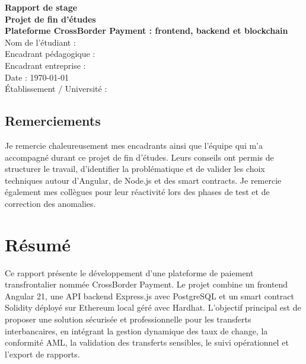 \documentclass[a4paper,12pt]{report}
\begin{document}
\begin{titlepage}
  \centering
  {\Huge\bfseries Rapport de stage \\ Projet de fin d'études \\ [2em]}
  {\Large\bfseries Plateforme CrossBorder Payment : frontend, backend et blockchain \\ [4em]}
  {\large Nom de l'étudiant : \underline{\hspace{8cm}} \\ [0.5em]}
  {\large Encadrant pédagogique : \underline{\hspace{8cm}} \\ [0.5em]}
  {\large Encadrant entreprise : \underline{\hspace{8cm}} \\ [0.5em]}
  {\large Date : \today \\ [4em]}
  \vfill
  {\large Établissement / Université : \underline{\hspace{8cm}}}
\end{titlepage}

\cleardoublepage
\thispagestyle{empty}
\section*{Remerciements}
Je remercie chaleureusement mes encadrants ainsi que l'équipe qui m'a accompagné durant ce projet de fin d'études. Leurs conseils ont permis de structurer le travail, d'identifier la problématique et de valider les choix techniques autour d'Angular, de Node.js et des smart contracts. Je remercie également mes collègues pour leur réactivité lors des phases de test et de correction des anomalies.

\vfill

\cleardoublepage
\chapter*{Résumé}
Ce rapport présente le développement d'une plateforme de paiement transfrontalier nommée CrossBorder Payment. Le projet combine un frontend Angular 21, une API backend Express.js avec PostgreSQL et un smart contract Solidity déployé sur Ethereum local géré avec Hardhat. L'objectif principal est de proposer une solution sécurisée et professionnelle pour les transferts interbancaires, en intégrant la gestion dynamique des taux de change, la conformité AML, la validation des transferts sensibles, le suivi opérationnel et l'export de rapports.
\end{document}
